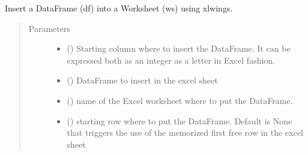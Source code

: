 \documentclass[letterpaper,10pt,english]{sphinxmanual}
\begin{document}
\begin{fulllineitems}
\begin{fulllineitems}
\begin{quote}
\begin{description}
\end{description}\end{quote}

\end{fulllineitems}


\begin{fulllineitems}
\label{\detokenize{api/postprocessing:output.ExcelOutputSheet.insert_df}}
\sphinxAtStartPar
Insert a DataFrame (df) into a Worksheet (ws) using xlwings.
\begin{quote}\begin{description}
\item[{Parameters}] \leavevmode\begin{itemize}
\item {} 
\sphinxAtStartPar
{} () \textendash{} Starting column where to insert the DataFrame. It can be expressed
both as an integer as a letter in Excel fashion.

\item {} 
\sphinxAtStartPar
{} () \textendash{} DataFrame to insert in the excel sheet

\item {} 
\sphinxAtStartPar
{} () \textendash{} name of the Excel worksheet where to put the DataFrame.

\item {} 
\sphinxAtStartPar
{} () \textendash{} starting row where to put the DataFrame. Default is None that
triggers the use of the memorized first free row in the excel sheet


\end{itemize}
\end{description}
\end{quote}
\end{fulllineitems}
\end{fulllineitems}
\end{document}

